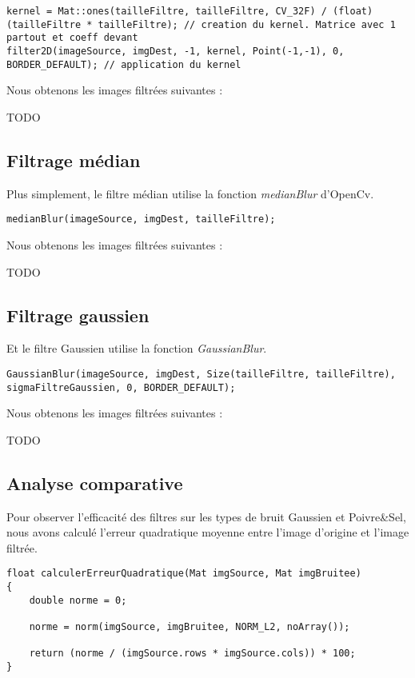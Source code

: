 \documentclass{article}
\begin{document}
 \begin{lstlisting}
kernel = Mat::ones(tailleFiltre, tailleFiltre, CV_32F) / (float)(tailleFiltre * tailleFiltre); // creation du kernel. Matrice avec 1 partout et coeff devant
filter2D(imageSource, imgDest, -1, kernel, Point(-1,-1), 0, BORDER_DEFAULT); // application du kernel
 \end{lstlisting}

 Nous obtenons les images filtrées suivantes :

 TODO


 \subsection{Filtrage médian}
 Plus simplement, le filtre médian utilise la fonction \emph{medianBlur} d'OpenCv.\\

 \begin{lstlisting}
medianBlur(imageSource, imgDest, tailleFiltre);
 \end{lstlisting}

 Nous obtenons les images filtrées suivantes :

 TODO

 \subsection{Filtrage gaussien}
 Et le filtre Gaussien utilise la fonction \emph{GaussianBlur}.

\begin{lstlisting}
GaussianBlur(imageSource, imgDest, Size(tailleFiltre, tailleFiltre), sigmaFiltreGaussien, 0, BORDER_DEFAULT);
 \end{lstlisting} 

 Nous obtenons les images filtrées suivantes :

 TODO

 \subsection{Analyse comparative}
 Pour observer l'efficacité des filtres sur les types de bruit Gaussien et Poivre\&Sel, nous avons calculé l'erreur quadratique moyenne entre l'image d'origine et l'image filtrée.\\

 \begin{lstlisting}
float calculerErreurQuadratique(Mat imgSource, Mat imgBruitee)
{
    double norme = 0;

    norme = norm(imgSource, imgBruitee, NORM_L2, noArray());

    return (norme / (imgSource.rows * imgSource.cols)) * 100;
}
 \end{lstlisting} 
\end{document}
